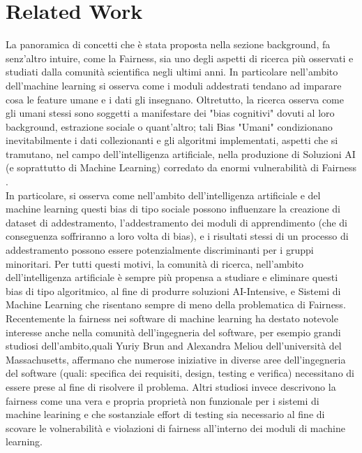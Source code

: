 \section{Related Work}
La panoramica di concetti che è stata proposta nella sezione background, fa senz'altro intuire, come la Fairness, sia uno degli aspetti di ricerca più osservati e studiati dalla comunità scientifica negli ultimi anni. In particolare nell'ambito dell'machine learning si osserva come i moduli addestrati tendano ad imparare cosa le feature umane e i dati gli insegnano. Oltretutto, la ricerca osserva come gli umani stessi sono soggetti a manifestare dei "bias cognitivi" dovuti al loro background, estrazione sociale o quant'altro; tali Bias "Umani" condizionano inevitabilmente i dati collezionanti e gli algoritmi implementati, aspetti che si tramutano, nel campo dell'intelligenza artificiale, nella produzione di Soluzioni AI (e soprattutto di Machine Learning) corredato da enormi vulnerabilità di Fairness \cite{Ignorance&Prejudice}. \\

In particolare, si osserva come nell'ambito dell'intelligenza artificiale e del machine learning questi bias di tipo sociale possono influenzare la creazione di dataset di addestramento, l'addestramento dei moduli di apprendimento (che di conseguenza soffriranno a loro volta di bias), e i risultati stessi di un processo di addestramento possono essere potenzialmente discriminanti per i gruppi minoritari\cite{vasudevan2020lift}. Per tutti questi motivi, la comunità di ricerca, nell'ambito dell'intelligenza artificiale è sempre più propensa a studiare e eliminare questi bias di tipo algoritmico, al fine di produrre soluzioni AI-Intensive, e Sistemi di Machine Learning che risentano sempre di meno della problematica di Fairness.\\

\cite{Ignorance&Prejudice} Recentemente la fairness nei software di machine learning ha destato notevole interesse anche nella comunità dell'ingegneria del software, per esempio grandi studiosi dell'ambito,quali Yuriy Brun and Alexandra Meliou dell'università del Massachusetts, affermano che numerose iniziative in diverse aree dell'ingegneria del software (quali: specifica dei requisiti, design, testing e verifica) necessitano di essere prese al fine di risolvere il problema. Altri studiosi invece descrivono la fairness come una vera e propria proprietà non funzionale per i sistemi di machine learining e che sostanziale effort di testing sia necessario al fine di scovare le volnerabilità e violazioni di fairness all'interno dei moduli di machine learning.\\

